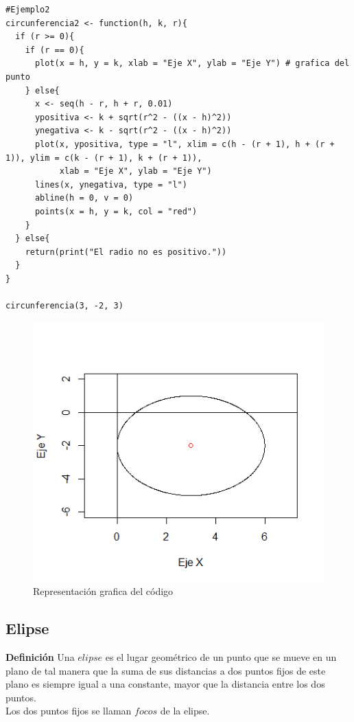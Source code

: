 \documentclass[12pt,a4paper]{article} %
\begin{document}
\begin{table}[htpb]
	\begin{lstlisting}
#Ejemplo2
circunferencia2 <- function(h, k, r){
  if (r >= 0){ 
    if (r == 0){ 
      plot(x = h, y = k, xlab = "Eje X", ylab = "Eje Y") # grafica del punto
    } else{
      x <- seq(h - r, h + r, 0.01) 
      ypositiva <- k + sqrt(r^2 - ((x - h)^2))
      ynegativa <- k - sqrt(r^2 - ((x - h)^2))
      plot(x, ypositiva, type = "l", xlim = c(h - (r + 1), h + (r + 1)), ylim = c(k - (r + 1), k + (r + 1)),
           xlab = "Eje X", ylab = "Eje Y")
      lines(x, ynegativa, type = "l") 
      abline(h = 0, v = 0) 
      points(x = h, y = k, col = "red") 
    }
  } else{
    return(print("El radio no es positivo."))
  }
}

circunferencia(3, -2, 3)
	\end{lstlisting}
	\caption{Segundo código en R para gráficar la circunferencia de la figura \ref{fig:Circunferencia2}.}
\label{alg:Circunferencia2}	
\end{table}

\begin{figure}
\centering
\includegraphics[scale=0.8]{Circunferencia2}
\caption{Representación grafica del código}
\label{fig:Circunferencia2}
\end{figure}


\newpage

\subsection{Elipse}
\citep{geometria}\textbf{Definición} Una $elipse$ es el lugar geométrico de un punto que se mueve en un plano de tal manera que la suma de sus distancias a dos puntos fijos de este plano es siempre igual a una constante, mayor que la distancia entre los dos puntos.
\\Los dos puntos fijos se llaman $focos$ de la elipse. 
\end{document}

